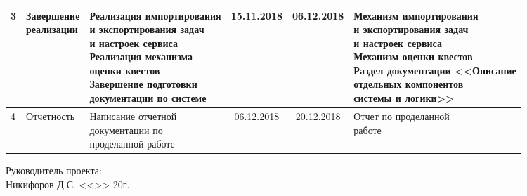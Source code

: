 \begin{tabular}[l]{|p{0.5cm}|p{3cm}|p{4.2cm}|c|c|p{4.1cm}|}
 \hline 3 & \specialcell{Завершение \\ реализации} & \specialcell{Реализация импортирования \\ и экспортирования задач \\ и настроек сервиса \\ Реализация механизма \\ оценки квестов \\ Завершение подготовки \\ документации по системе} & 15.11.2018 & 06.12.2018 & \specialcell{Механизм импортирования \\ и экспортирования задач \\ и настроек сервиса \\ Механизм оценки квестов \\ Раздел документации <<Описание \\ отдельных компонентов \\ системы и логики>>} \\
 \hline 4 & Отчетность & \specialcell{Написание отчетной \\ документации по \\ проделанной работе} & 06.12.2018 & 20.12.2018 & \specialcell{Отчет по проделанной \\ работе} \\
\hline
\end{tabular}

\vspace{\baselineskip}

\begin{flushleft}
\begin{minipage}{0.45\textwidth}
 \begin{flushleft}
Руководитель проекта:\\
\underline{\hspace{1.5cm}} Никифоров Д.С.
<<\underline{\hspace{1cm}}>>\underline{\hspace{3cm}} 20\underline{\hspace{0.5cm}}г.\\
 \end{flushleft}
 \end{minipage}
\end{flushleft}

